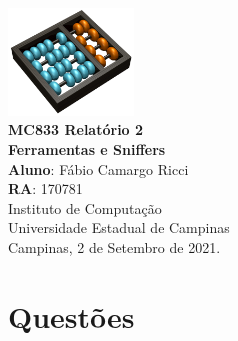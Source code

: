 \documentclass[12pt,a4paper]{report}
\begin{document}
\begin{titlepage}
    \begin{center}
        \vspace*{1cm}
        \includegraphics[width=0.25\textwidth]{Logo}\\
        \vspace{1.5cm}
        \Huge
    	\textbf{MC833 Relatório 2 \\
        Ferramentas e Sniffers} \\
        \vspace{1.5cm}
        \Large
        \textbf{Aluno}: Fábio Camargo Ricci\\
        \textbf{RA}: 170781\\
        \vspace{1.2cm}
    	\Large 
    	Instituto de Computação\\
    	Universidade Estadual de Campinas\\
    	\vspace{1.5cm}
        Campinas, 2 de Setembro de 2021.
    \end{center}
\end{titlepage}
\tableofcontents
\clearpage

\newcommand{\shellcmd}[1]{\texttt{\footnotesize\# #1}}%

\section{Questões}
\end{document}
